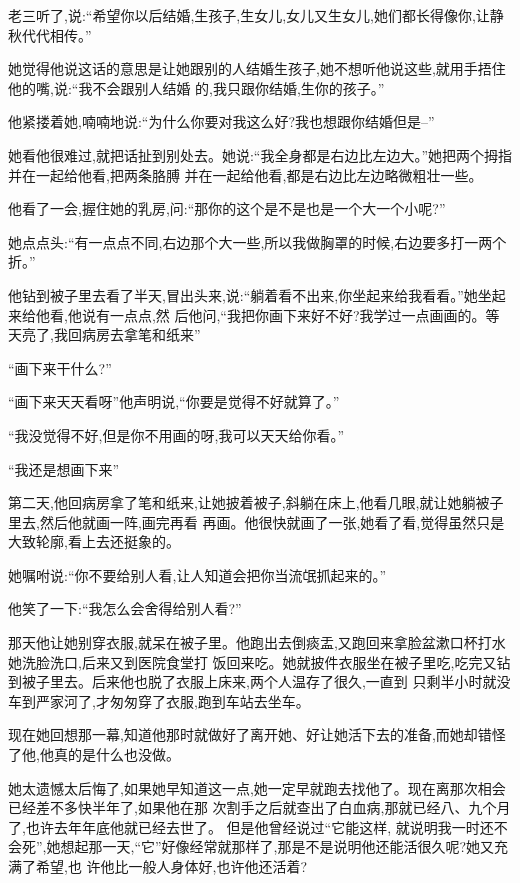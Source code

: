 ﻿\documentclass[12pt]{article}
\begin{document}
老三听了,说:``希望你以后结婚,生孩子,生女儿,女儿又生女儿,她们都长得像你,让静秋代代相传。''

她觉得他说这话的意思是让她跟别的人结婚生孩子,她不想听他说这些,就用手捂住他的嘴,说:``我不会跟别人结婚
的,我只跟你结婚,生你的孩子。''

他紧搂着她,喃喃地说:``为什么你\myrule 要对我\myrule 这么好?我也想\myrule 跟你结婚\myrule 但是--''

她看他很难过,就把话扯到别处去。她说:``我全身都是右边比左边大。''她把两个拇指并在一起给他看,把两条胳膊
并在一起给他看,都是右边比左边略微粗壮一些。

他看了一会,握住她的乳房,问:``那你的这个\myrule 是不是也是一个大一个小呢?''

她点点头:``有一点点不同,右边那个大一些,所以我做\myrule 胸罩的时候,右边要多打一两个折。''

他钻到被子里去看了半天,冒出头来,说:``躺着看不出来,你坐起来给我看看。''她坐起来给他看,他说有一点点,然
后他问,``我把你画下来好不好?我学过一点画画的\myrule 。等天亮了,我回病房去拿笔和纸来\myrule ''

``画下来干什么?''

``画下来天天看呀\myrule ''他声明说,``你要是觉得不好就算了。''

``我没觉得不好,但是你不用画的呀,我可以\myrule 天天给你看。''

``我还是想画下来\myrule ''

第二天,他回病房拿了笔和纸来,让她披着被子,斜躺在床上,他看几眼,就让她躺被子里去,然后他就画一阵,画完再看
再画。他很快就画了一张,她看了看,觉得虽然只是大致轮廓,看上去还挺象的。

她嘱咐说:``你不要给别人看,让人知道会把你当流氓抓起来的。''

他笑了一下:``我怎么会舍得给别人看?''

那天他让她别穿衣服,就呆在被子里。他跑出去倒痰盂,又跑回来拿脸盆漱口杯打水她洗脸洗口,后来又到医院食堂打
饭回来吃。她就披件衣服坐在被子里吃,吃完又钻到被子里去。后来他也脱了衣服上床来,两个人温存了很久,一直到
只剩半小时就没车到严家河了,才匆匆穿了衣服,跑到车站去坐车。

现在她回想那一幕,知道他那时就做好了离开她、好让她活下去的准备,而她却错怪了他,他真的是什么也没做。

她太遗憾太后悔了,如果她早知道这一点,她一定早就跑去找他了。现在离那次相会已经差不多快半年了,如果他在那
次割手之后就查出了白血病,那就已经八、九个月了,也许去年年底他就已经去世了。 但是他曾经说过``它能这样,
就说明我一时还不会死'',她想起那一天,``它''好像经常就那样了,那是不是说明他还能活很久呢?她又充满了希望,也
许他比一般人身体好,也许他还活着?
\end{document}
